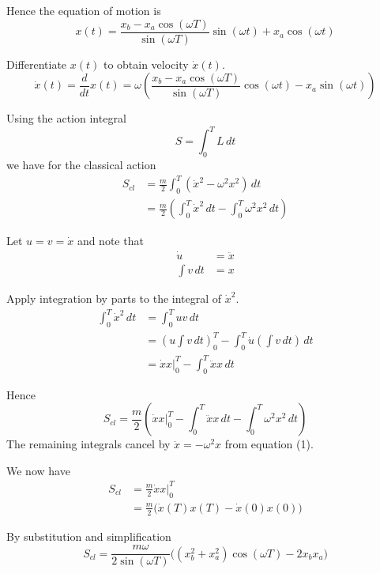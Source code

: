 \documentclass[12pt]{article}
\begin{document}
Hence the equation of motion is
\begin{equation*}
x(t)=\frac{x_b-x_a\cos(\omega T)}{\sin(\omega T)}\sin(\omega t)+x_a\cos(\omega t)
\tag{2}
\end{equation*}

Differentiate $x(t)$ to obtain velocity $\dot x(t)$.
\begin{equation*}
\dot x(t)=\frac{d}{dt}x(t)=
\omega\left(
\frac{x_b-x_a\cos(\omega T)}{\sin(\omega T)}\cos(\omega t)-x_a\sin(\omega t)
\right)
\tag{3}
\end{equation*}

Using the action integral
\begin{equation*}
S=\int_0^T L\,dt
\end{equation*}
we have for the classical action
\begin{align*}
S_{cl}&=\frac{m}{2}\int_0^T (\dot{x}^2-\omega^2 x^2)\,dt
\\[1ex]
&=\frac{m}{2}\left(
\int_0^T\dot{x}^2\,dt
-\int_0^T\omega^2x^2\,dt\right)
\end{align*}

Let $u=v=\dot x$ and note that
\begin{align*}
\dot u&=\ddot x
\\[1ex]
\int v\,dt&=x
\end{align*}

Apply integration by parts to the integral of $\dot x^2$.
\begin{align*}
\int_0^T \dot x^2\,dt
&=\int_0^T uv\,dt
\\[1ex]
&=\left(u\int v\,dt\right)_0^T
-\int_0^T\dot u\left(\int v\,dt\right)\,dt
\\[1ex]
&=\dot xx\bigg|_0^T-\int_0^T \ddot xx\,dt
\end{align*}

Hence
\begin{equation*}
S_{cl}=\frac{m}{2}\left(
\dot xx\bigg|_0^T-\int_0^T \ddot xx\,dt
-\int_0^T\omega^2x^2\,dt
\right)
\end{equation*}
The remaining integrals cancel by $\ddot x=-\omega^2x$ from equation (1).

\bigskip
We now have
\begin{align*}
S_{cl}&=\frac{m}{2}\dot xx\bigg|_0^T
\\[1ex]
&=\frac{m}{2}\bigg(\dot x(T)x(T)-\dot x(0)x(0)\bigg)
\tag{4}
\end{align*}

By substitution and simplification
\begin{equation*}
S_{cl}=\frac{m\omega}{2\sin(\omega T)}
\bigg((x_b^2+x_a^2)\cos(\omega T)-2x_b x_a\bigg)
\tag{5}
\end{equation*}
\end{document}
